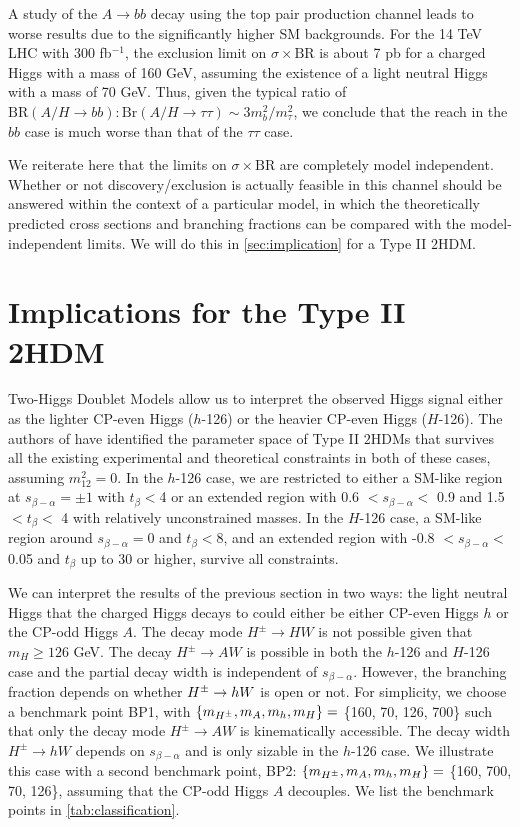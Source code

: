 A study of the $A \rightarrow bb$ decay using the top pair production channel leads to worse results due to the significantly higher SM backgrounds. For the 14 TeV LHC with 300 fb$^{-1}$, the exclusion limit on $\sigma \times \text{BR}$ is about 7 pb for a charged Higgs with a mass of 160 GeV, assuming the existence of a light neutral Higgs with a mass of 70 GeV. Thus, given the typical ratio of $\text{BR}(A/H \rightarrow bb) : \text{Br}(A/H\rightarrow \tau\tau) \sim 3m^2_b/m^2_{\tau}$, we conclude that the reach in the $bb$ case is much worse than that of the $\tau\tau$ case.

We reiterate here that the limits on $\sigma \times \text{BR}$ are completely model independent. Whether or not discovery/exclusion is actually feasible in this channel should be answered within the context of a particular model, in which the theoretically predicted cross sections and branching fractions can be compared with the model-independent limits. We will do this in \autoref{sec:implication} for a Type II $2$HDM. 

\section{Implications for the Type II 2HDM}\label{sec:implication}

Two-Higgs Doublet Models allow us to interpret the observed Higgs signal either as the lighter CP-even Higgs ($h$-126) or the heavier CP-even Higgs ($H$-126). The authors of \cite{Coleppa:2013dya} have identified the parameter space of Type II $2$HDMs that survives all the existing experimental and theoretical constraints in both of these cases, assuming $m_{12}^2=0$. In the $h$-126 case, we are restricted to either a SM-like region at $s_{\beta-\alpha}=\pm1$ with $t_{\beta}<$4 or an extended region with 0.6 $<s_{\beta-\alpha}<$ 0.9 and 1.5 $<t_{\beta}<$ 4 with relatively unconstrained masses. In the $H$-126 case, a SM-like region around $s_{\beta-\alpha}=0$ and $t_{\beta}<8$, and an extended region with -0.8 $< s_{\beta-\alpha}<$ 0.05 and $t_{\beta}$ up to 30 or higher, survive all constraints. 
 
We can interpret the results of the previous section in two ways: the light neutral Higgs that the charged Higgs decays to could either be either CP-even Higgs $h$ or the CP-odd Higgs $A$. The decay mode $H^{\pm} \rightarrow HW$ is not possible given that $m_{H}\geq 126$ GeV. The decay $H^{\pm} \rightarrow AW$ is possible in both the $h$-126 and $H$-126 case and the partial decay width is independent of $s_{\beta-\alpha}$. However, the branching fraction depends on whether $H^{\pm} \rightarrow h W$ is open or not. For simplicity, we choose a benchmark point BP1, with $\left\{ {m_{H^{\pm}},m_{A},m_{h},m_{H}}\right\}=$ \{160, 70, 126, 700\} such that only the decay mode $H^{\pm} \rightarrow AW$ is kinematically accessible. The decay width $H^{\pm} \rightarrow h W$ depends on $s_{\beta-\alpha}$ and is only sizable in the $h$-126 case. We illustrate this case with a second benchmark point, BP2: $\left\{ {m_{H^{\pm}},m_{A},m_{h},m_{H}}\right\}=$ \{160, 700, 70, 126\}, assuming that the CP-odd Higgs $A$ decouples. We list the benchmark points in \autoref{tab:classification}. 

